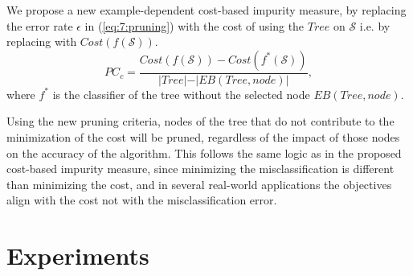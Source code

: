 		We propose a new example-dependent cost-based impurity measure, by replacing the error rate 
		$\epsilon$ in (\ref{eq:7:pruning}) with the cost of using the $Tree$ on $\mathcal{S}$ i.e. by 
    replacing with 	$Cost(f(\mathcal{S}))$.
		\begin{equation}\label{eq:cost_pruning}
			PC_{c} = \frac{ Cost(f(\mathcal{S})) - Cost(f^*(\mathcal{S})) }
		  {\vert Tree\vert-\vert EB(Tree,node)\vert} ,
		\end{equation}
		where $f^*$ is the classifier of the tree without the selected node $EB(Tree,node)$.
 
		Using the new pruning criteria, nodes of the tree that do not contribute to the minimization of 
		the cost will be pruned, regardless of the impact of those nodes on the accuracy of the
		algorithm. This follows the same logic as in the proposed cost-based impurity measure, since 
		minimizing the misclassification is different than minimizing the cost, and in several 
		real-world applications the objectives align with the cost not with the misclassification error.
		
\section{Experiments}
\label{sec:7:experiments}

